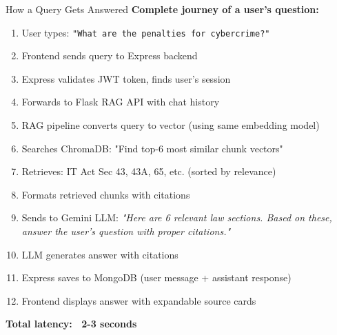 \documentclass[11pt,aspectratio=16:9]{beamer}
\begin{document}
\begin{frame}{How a Query Gets Answered}
    \textbf{Complete journey of a user's question:}
    
    \vspace{0.3cm}
    
    \begin{small}
    \begin{enumerate}
        \item User types: \texttt{"What are the penalties for cybercrime?"}
        \item Frontend sends query to Express backend
        \item Express validates JWT token, finds user's session
        \item Forwards to Flask RAG API with chat history
        \item RAG pipeline converts query to vector (using same embedding model)
        \item Searches ChromaDB: "Find top-6 most similar chunk vectors"
        \item Retrieves: IT Act Sec 43, 43A, 65, etc. (sorted by relevance)
        \item Formats retrieved chunks with citations
        \item Sends to Gemini LLM: \textit{"Here are 6 relevant law sections. Based on these, answer the user's question with proper citations."}
        \item LLM generates answer with citations
        \item Express saves to MongoDB (user message + assistant response)
        \item Frontend displays answer with expandable source cards
    \end{enumerate}
    \end{small}
    
    \vspace{0.5cm}
    {\textbf{Total latency: ~2-3 seconds}}
\end{frame}
\end{document}
